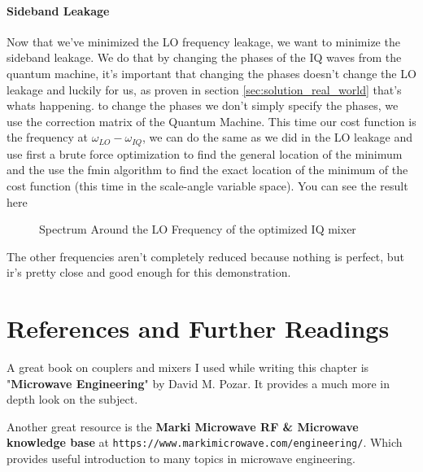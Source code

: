\paragraph{Sideband Leakage}
Now that we've minimized the LO frequency leakage, we want to minimize the sideband leakage. We do that by changing the phases of the IQ waves from the quantum machine, it's important that changing the phases doesn't change the LO leakage and luckily for us, as proven in section \ref{sec:solution_real_world} that's whats happening. to change the phases we don't simply specify the phases, we use the correction matrix of the Quantum Machine.
This time our cost function is the frequency at $\omega_{LO} - \omega_{IQ}$, we can do the same as we did in the LO leakage and use first a brute force optimization to find the general location of the minimum and the use the fmin algorithm to find the exact location of the minimum of the cost function (this time in the scale-angle variable space). You can see the result here
\begin{figure}[H]
    \begin{center}
         
    \end{center}
    \caption{Spectrum Around the LO Frequency of the optimized IQ mixer}
    \label{fig:closeup-spectrum-corrections}
\end{figure}

The other frequencies aren't completely reduced because nothing is perfect, but ir's pretty close and good enough for this demonstration.

\section{References and Further Readings}
A great book on couplers and mixers I used while writing this chapter is "\textbf{Microwave Engineering}" by David M. Pozar. It provides a much more in depth look on the subject.

Another great resource is the \textbf{Marki Microwave RF \& Microwave knowledge base} at \newline \texttt{https://www.markimicrowave.com/engineering/}. Which provides useful introduction to many topics in microwave engineering.